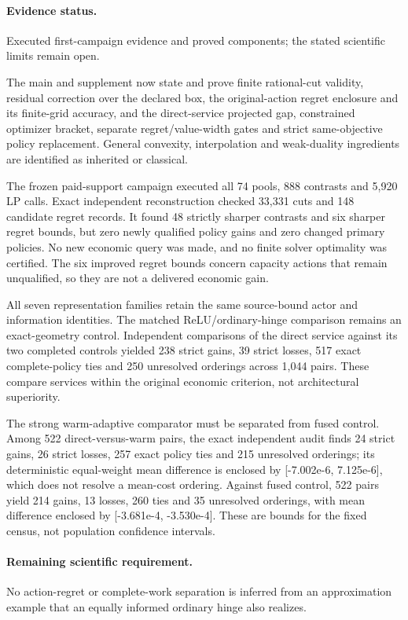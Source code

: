 \paragraph{Evidence status.} Executed first-campaign evidence and proved components; the stated scientific limits remain open.

The main and supplement now state and prove finite rational-cut validity, residual correction over the declared box, the original-action regret enclosure and its finite-grid accuracy, and the direct-service projected gap, constrained optimizer bracket, separate regret/value-width gates and strict same-objective policy replacement. General convexity, interpolation and weak-duality ingredients are identified as inherited or classical.\par
The frozen paid-support campaign executed all 74 pools, 888 contrasts and 5,920 LP calls. Exact independent reconstruction checked 33,331 cuts and 148 candidate regret records. It found 48 strictly sharper contrasts and six sharper regret bounds, but zero newly qualified policy gains and zero changed primary policies. No new economic query was made, and no finite solver optimality was certified. The six improved regret bounds concern capacity actions that remain unqualified, so they are not a delivered economic gain.\par
All seven representation families retain the same source-bound actor and information identities. The matched ReLU/ordinary-hinge comparison remains an exact-geometry control. Independent comparisons of the direct service against its two completed controls yielded 238 strict gains, 39 strict losses, 517 exact complete-policy ties and 250 unresolved orderings across 1,044 pairs. These compare services within the original economic criterion, not architectural superiority.\par
The strong warm-adaptive comparator must be separated from fused control. Among 522 direct-versus-warm pairs, the exact independent audit finds 24 strict gains, 26 strict losses, 257 exact policy ties and 215 unresolved orderings; its deterministic equal-weight mean difference is enclosed by [-7.002e-6, 7.125e-6], which does not resolve a mean-cost ordering. Against fused control, 522 pairs yield 214 gains, 13 losses, 260 ties and 35 unresolved orderings, with mean difference enclosed by [-3.681e-4, -3.530e-4]. These are bounds for the fixed census, not population confidence intervals.\par

\paragraph{Remaining scientific requirement.} No action-regret or complete-work separation is inferred from an approximation example that an equally informed ordinary hinge also realizes.

